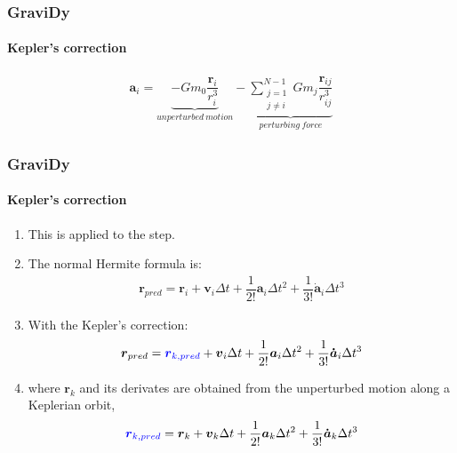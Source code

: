\begin{frame}
    \frametitle{GraviDy}
    \framesubtitle{Kepler's correction}
    \begin{eqnarray}
        \boldsymbol{a}_{i} =   \underbrace{ - G m_{0}
                                          \dfrac{\boldsymbol{r}_{i}}{r_{i}^{3}}
                                          }_{unperturbed\ motion}
                             - \underbrace{ \sum\limits_{\substack{j=1\\j\neq i}}^{N-1}
                                            G m_{j} \dfrac{\boldsymbol{r}_{ij}}{r_{ij}^{3}}
                                          }_{perturbing\ force}
    \end{eqnarray}
\end{frame}

\begin{frame}
    \frametitle{GraviDy}
    \framesubtitle{Kepler's correction}
    \begin{enumerate}
        \item This is applied to the  step.
        \item The normal Hermite formula is:
        \begin{eqnarray}
            \boldsymbol{r}_{pred} =    \boldsymbol{      r}_{i}              +
                                       \boldsymbol{      v}_{i} \Delta t     +
                         \dfrac{1}{2!} \boldsymbol{      a}_{i} \Delta t^{2} +
                         \dfrac{1}{3!} \boldsymbol{\dot{a}}_{i} \Delta t^{3}
        \end{eqnarray}
        \item With the Kepler's correction:
        \begin{eqnarray}
            \boldsymbol{r}_{pred} =    \textcolor{blue}{\boldsymbol{      r}_{k,pred}}         +
                                             \boldsymbol{      v}_{i} \Delta t     +
                         \dfrac{1}{2!}       \boldsymbol{      a}_{i} \Delta t^{2} +
                         \dfrac{1}{3!}       \boldsymbol{\dot{a}}_{i} \Delta t^{3}
        \end{eqnarray}
        \item where $\boldsymbol{r}_{k}$ and its derivates 
            are obtained from the unperturbed motion along a Keplerian orbit,
        \begin{eqnarray}
            \textcolor{blue}{\boldsymbol{r}_{k,pred}} =  \boldsymbol{      r}_{k}              +
                                       \boldsymbol{      v}_{k} \Delta t     +
                         \dfrac{1}{2!} \boldsymbol{      a}_{k} \Delta t^{2} +
                         \dfrac{1}{3!} \boldsymbol{\dot{a}}_{k} \Delta t^{3}
        \end{eqnarray}

    \end{enumerate}
\end{frame}

